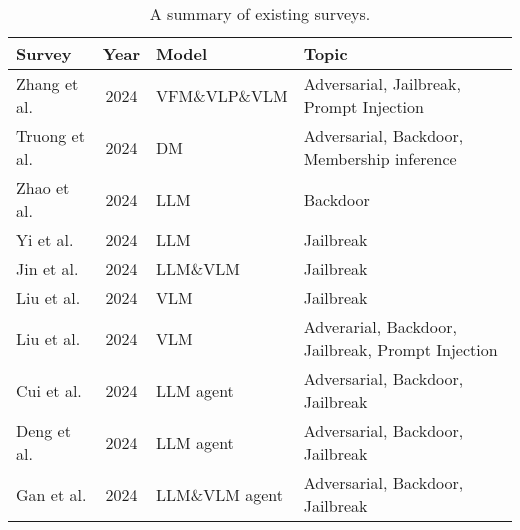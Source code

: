 \begin{table}[htbp]
  \centering
  \caption{A summary of existing surveys.}
  \begin{adjustbox}{width=1.0\linewidth}
    \begin{tabular}{p{7.75em}cp{10.665em}p{20.335em}}
    \toprule
    \textbf{Survey} & \textbf{Year}  & \textbf{Model} & \textbf{Topic} \\
    \midrule
    Zhang et al. \cite{zhang2024adversarial} & 2024  & VFM\&VLP\&VLM & Adversarial, Jailbreak, Prompt Injection \\
    \rowcolor{gray!15} Truong et al. \cite{truong2024attacks} & 2024  & DM & Adversarial, Backdoor, Membership inference \\
    Zhao et al. \cite{zhao2024survey} & 2024  & LLM & Backdoor \\
    \rowcolor{gray!15} Yi et al. \cite{yi2024jailbreak} & 2024  & LLM & Jailbreak \\
    Jin et al. \cite{jin2024jailbreakzoo} & 2024  & LLM\&VLM & Jailbreak \\
    \rowcolor{gray!15} Liu et al. \cite{liu2024jailbreak} & 2024  & VLM & Jailbreak \\
    Liu et al. \cite{liu2024survey} & 2024  & VLM & Adverarial, Backdoor, Jailbreak, Prompt Injection \\
    \rowcolor{gray!15} Cui et al. \cite{cui2024risk} & 2024  & LLM agent & Adversarial, Backdoor, Jailbreak \\
    Deng et al. \cite{deng2024ai} & 2024  & LLM agent & Adversarial, Backdoor, Jailbreak \\
    \rowcolor{gray!15} Gan et al. \cite{gan2024navigating} & 2024  & LLM\&VLM agent & Adversarial, Backdoor, Jailbreak \\
    \bottomrule
    \end{tabular}%
    \end{adjustbox}
  \label{tab:existing_survey}%
\end{table}%



